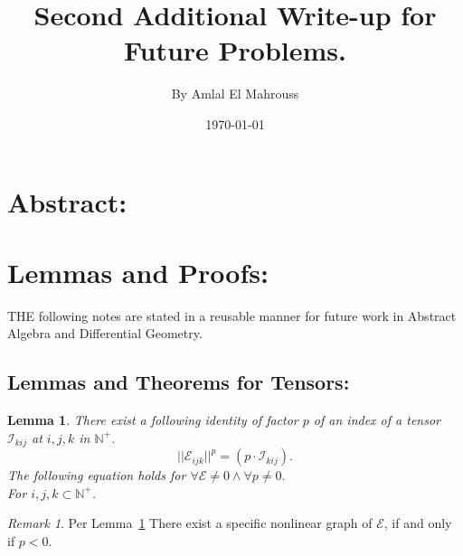 \documentclass[10pt]{article}
\title{%
	\vspace{-1.5em}%
	\large\textbf{Second Additional Write-up for Future Problems.}%
}
\author{By Amlal El Mahrouss}
\date{\today}
\theoremstyle{plain}
\newtheorem{lemma}[theorem]{Lemma}
\theoremstyle{definition}
\theoremstyle{remark}
\newtheorem{remark}[theorem]{Remark}
\begin{document}

\maketitle
\tableofcontents
\newpage

\section{Abstract:}

\section{Lemmas and Proofs:}

\lettrine[lines=1, lhang=0.1, loversize=0.2]{T}HE following notes are stated in a reusable manner for future work in Abstract Algebra and Differential Geometry.

\subsection{Lemmas and Theorems for Tensors:}

\begin{lemma}
\label{lem:1}
There exist a following identity of factor $p$ of an index of a tensor $\mathcal{I}_{kij}$ at $i, j, k$ in $\mathbb{N}^{+}$.
\begin{equation}
	||\mathcal{E}_{ijk}||^{p} = (p \cdot \mathcal{I}_{kij}).
\end{equation}
The following equation holds for $\forall \mathcal{E} \neq 0 \land \forall p \neq 0.$\\
For $i, j, k \subset \mathbb{N}^{+}$.
\end{lemma}
\begin{remark}
Per Lemma~\ref{lem:1} There exist a specific nonlinear graph of $\mathcal{E}$, if and only if $p < 0$.
\end{remark}
\end{document}
